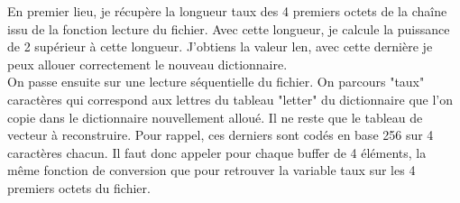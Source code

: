 		En premier lieu, je récupère la longueur taux des 4 premiers octets de la chaîne issu de la fonction lecture du fichier. Avec cette longueur, je calcule la puissance de 2 supérieur à cette longueur. J'obtiens la valeur len, avec cette dernière je peux allouer correctement le nouveau dictionnaire.\\
		On passe ensuite sur une lecture séquentielle du fichier. On parcours "taux" caractères qui correspond aux lettres du tableau "letter" du dictionnaire que l'on copie dans le dictionnaire nouvellement alloué.
		Il ne reste que le tableau de vecteur à reconstruire. Pour rappel, ces derniers sont codés en base 256 sur 4 caractères chacun. Il faut donc appeler pour chaque buffer de 4 éléments, la même fonction de conversion que pour retrouver la variable taux sur les 4 premiers octets du fichier.\\
		
